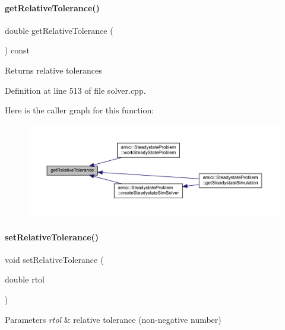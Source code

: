 \paragraph{\texorpdfstring{get\+Relative\+Tolerance()}{getRelativeTolerance()}}
{\footnotesize\ttfamily double get\+Relative\+Tolerance (\begin{DoxyParamCaption}{ }\end{DoxyParamCaption}) const}

\begin{DoxyReturn}{Returns}
relative tolerances 
\end{DoxyReturn}


Definition at line 513 of file solver.\+cpp.

Here is the caller graph for this function\+:
\nopagebreak
\begin{figure}[H]
\begin{center}
\leavevmode
\includegraphics[width=350pt]{classamici_1_1_solver_a54fe1b062315ed19b2dbf88206415e06_icgraph}
\end{center}
\end{figure}
\mbox{\label{classamici_1_1_solver_afb5f0c48f24e4bc3efad8ef599adde56}} 
\paragraph{\texorpdfstring{set\+Relative\+Tolerance()}{setRelativeTolerance()}}
{\footnotesize\ttfamily void set\+Relative\+Tolerance (\begin{DoxyParamCaption}\item[{double}]{rtol }\end{DoxyParamCaption})}


\begin{DoxyParams}{Parameters}
{\em rtol} & relative tolerance (non-\/negative number) \\
\hline
\end{DoxyParams}


